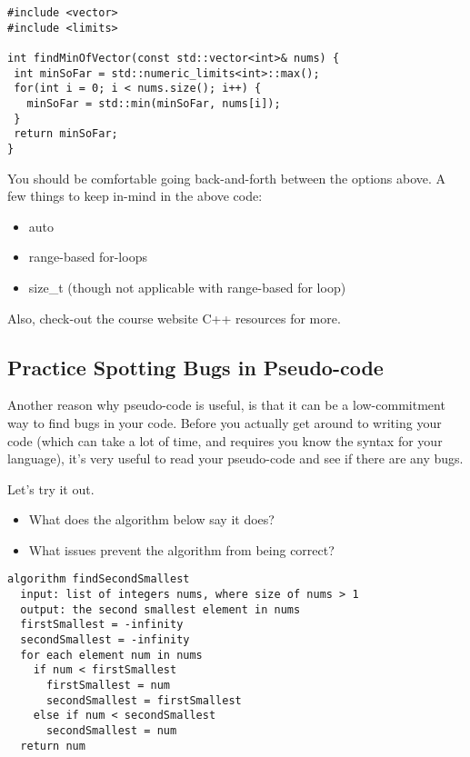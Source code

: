 \documentclass [12pt]{article}
\begin{document}
\begin{lstlisting}
#include <vector>
#include <limits>

int findMinOfVector(const std::vector<int>& nums) {
 int minSoFar = std::numeric_limits<int>::max();
 for(int i = 0; i < nums.size(); i++) {
   minSoFar = std::min(minSoFar, nums[i]);
 }
 return minSoFar;
}
\end{lstlisting}

You should be comfortable going back-and-forth between the options above. A few things to keep in-mind in the above code:

\begin{itemize}
    \item auto
    \item range-based for-loops
    \item size\_t (though not applicable with range-based for loop)
\end{itemize}

Also, check-out the course website C++ resources for more.

\subsection{Practice Spotting Bugs in Pseudo-code}

Another reason why pseudo-code is useful, is that it can be a low-commitment way to find bugs in your code. Before you actually get around to writing your code (which can take a lot of time, and requires you know the syntax for your language), it's very useful to read your pseudo-code and see if there are any bugs.

Let's try it out. 

\begin{itemize}
    \item What does the algorithm below say it does?
    \item What issues prevent the algorithm from being correct?
\end{itemize}

\begin{verbatim}
algorithm findSecondSmallest
  input: list of integers nums, where size of nums > 1
  output: the second smallest element in nums
  firstSmallest = -infinity
  secondSmallest = -infinity
  for each element num in nums
    if num < firstSmallest
      firstSmallest = num
      secondSmallest = firstSmallest
    else if num < secondSmallest
      secondSmallest = num
  return num
\end{verbatim}
\end{document}
